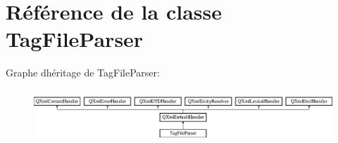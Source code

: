 \hypertarget{class_tag_file_parser}{}\section{Référence de la classe Tag\+File\+Parser}
\label{class_tag_file_parser}
Graphe d\textquotesingle{}héritage de Tag\+File\+Parser\+:\begin{figure}[H]
\begin{center}
\leavevmode
\includegraphics[height=2.014389cm]{class_tag_file_parser}
\end{center}
\end{figure}
